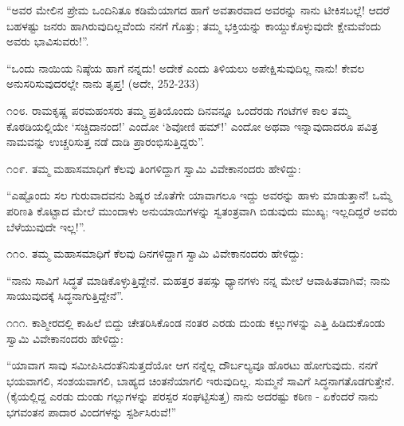 “ಅವರ ಮೇಲಿನ ಪ್ರೇಮ ಒಂದಿನಿತೂ ಕಡಿಮೆಯಾಗದ ಹಾಗೆ ಅವತಾರವಾದ ಅವರನ್ನು ನಾನು ಟೀಕಿಸಬಲ್ಲೆ! ಆದರೆ ಬಹಳಷ್ಟು ಜನರು ಹಾಗಿರುವುದಿಲ್ಲವೆಂದು ನನಗೆ ಗೊತ್ತು; ತಮ್ಮ ಭಕ್ತಿಯನ್ನು ಕಾಯ್ದುಕೊಳ್ಳುವುದೇ ಕ್ಷೇಮವೆಂದು ಅವರು ಭಾವಿಸುವರು!”. 

“ಒಂದು ನಾಯಿಯ ನಿಷ್ಠೆಯ ಹಾಗೆ ನನ್ನದು! ಅದೇಕೆ ಎಂದು ತಿಳಿಯಲು ಅಪೇಕ್ಷಿಸುವುದಿಲ್ಲ ನಾನು! ಕೇವಲ ಅನುಸರಿಸುವುದರಲ್ಲೇ ನಾನು ತೃಪ್ತ! (ಅದೇ, 252-233)

೧೦೮. ರಾಮಕೃಷ್ಣ ಪರಮಹಂಸರು ತಮ್ಮ ಪ್ರತಿಯೊಂದು ದಿನವನ್ನೂ ಒಂದೆರಡು ಗಂಟೆಗಳ ಕಾಲ ತಮ್ಮ ಕೊಠಡಿಯಲ್ಲಿಯೇ ‘ಸಚ್ಚಿದಾನಂದ!’ ಎಂದೋ ‘ಶಿವೋಣಿ ಹಮ್​!’ ಎಂದೋ ಅಥವಾ ಇನ್ನಾವುದಾದರೂ ಪವಿತ್ರ ನಾಮವನ್ನು ಉಚ್ಚರಿಸುತ್ತ ನಡೆ ದಾಡಿ ಪ್ರಾರಂಭಿಸುತ್ತಿದ್ದರು”. 

೧೦೯. ತಮ್ಮ ಮಹಾಸಮಾಧಿಗೆ ಕೆಲವು ತಿಂಗಳಿದ್ದಾಗ ಸ್ವಾಮಿ ವಿವೇಕಾನಂದರು ಹೇಳಿದ್ದು:

“ಎಷ್ಟೊಂದು ಸಲ ಗುರುವಾದವನು ಶಿಷ್ಯರ ಜೊತೆಗೇ ಯಾವಾಗಲೂ ಇದ್ದು ಅವರನ್ನು ಹಾಳು ಮಾಡುತ್ತಾನೆ! ಒಮ್ಮೆ ಪರಿಣತಿ ಕೊಟ್ಟಾದ ಮೇಲೆ ಮುಂದಾಳು ಅನುಯಾಯಿಗಳನ್ನು ಸ್ವತಂತ್ರವಾಗಿ ಬಿಡುವುದು ಮುಖ್ಯ; ಇಲ್ಲದಿದ್ದರೆ ಅವರು ಬೆಳೆಯುವುದೇ ಇಲ್ಲ!”. 

೧೧೦. ತಮ್ಮ ಮಹಾಸಮಾಧಿಗೆ ಕೆಲವು ದಿನಗಳಿದ್ದಾಗ ಸ್ವಾಮಿ ವಿವೇಕಾನಂದರು ಹೇಳಿದ್ದು:

“ನಾನು ಸಾವಿಗೆ ಸಿದ್ಧತೆ ಮಾಡಿಕೊಳ್ಳುತ್ತಿದ್ದೇನೆ. ಮಹತ್ತರ ತಪಸ್ಸು ಧ್ಯಾನಗಳು ನನ್ನ ಮೇಲೆ ಆವಾಹಿತವಾಗಿವೆ; ನಾನು ಸಾಯುವುದಕ್ಕೆ ಸಿದ್ಧನಾಗುತ್ತಿದ್ದೇನೆ”. 

೧೧೧. ಕಾಶ್ಮೀರದಲ್ಲಿ ಕಾಹಿಲೆ ಬಿದ್ದು ಚೇತರಿಸಿಕೊಂಡ ನಂತರ ಎರಡು ದುಂಡು ಕಲ್ಲುಗಳನ್ನು ಎತ್ತಿ ಹಿಡಿದುಕೊಂಡು ಸ್ವಾಮಿ ವಿವೇಕಾನಂದರು ಹೇಳಿದ್ದು:

“ಯಾವಾಗ ಸಾವು ಸಮೀಪಿಸಿದಂತೆನಿಸುತ್ತದೆಯೋ ಆಗ ನನ್ನೆಲ್ಲ ದೌರ್ಬಲ್ಯವೂ ಹೊರಟು ಹೋಗುವುದು. ನನಗೆ ಭಯವಾಗಲಿ, ಸಂಶಯವಾಗಲಿ, ಬಾಹ್ಯದ ಚಿಂತನೆಯಾಗಲಿ ಇರುವುದಿಲ್ಲ. ಸುಮ್ಮನೆ ಸಾವಿಗೆ ಸಿದ್ಧನಾಗತೊಡಗುತ್ತೇನೆ. (ಕೈಯಲ್ಲಿದ್ದ ಎರಡು ದುಂಡು ಗಲ್ಲುಗಳನ್ನು ಪರಸ್ಪರ ಸಂಘಟ್ಟಿಸುತ್ತ) ನಾನು ಅದರಷ್ಟು ಕಠಿಣ - ಏಕೆಂದರೆ ನಾನು ಭಗವಂತನ ಪಾದಾರ ವಿಂದಗಳನ್ನು ಸ್ಪರ್ಶಿಸಿರುವೆ!” 

